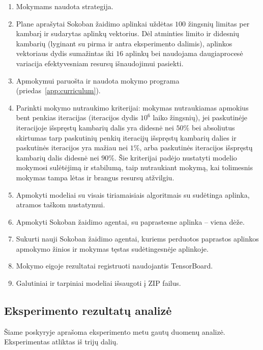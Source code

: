 \documentclass{VUMIFPSbakalaurinis}
\begin{document}
{\begin{enumerate}
\begin{enumerate}
			\item Mokymams naudota  strategija.
			\item Plane aprašytai Sokoban žaidimo aplinkai uždėtas \(100\) žingsnių limitas per kambarį ir sudarytas aplinkų vektorius. Dėl atminties limito ir didesnių kambarių (lyginant su pirma ir antra eksperimento dalimis), aplinkos vektoriaus dydis sumažintas iki \(16\) aplinkų bei naudojama daugiaprocesė variacija efektyvesniam resursų išnaudojimui pasiekti. 
			\item Apmokymui paruošta ir naudota mokymo programa (priedas~\ref{app:curriculum}).
			\item Parinkti mokymo nutraukimo kriterijai: mokymas nutraukiamas apmokius bent penkias iteracijas (iteracijos dydis \(10^6\) laiko žingsnių), jei paskutinėje iteracijoje išspręstų kambarių dalis yra didesnė nei \(50\%\) bei absoliutus skirtumas tarp paskutinių penkių iteracijų išspręstų kambarių dalies ir paskutinės iteracijos yra mažiau nei \(1\%\), arba paskutinės iteracijos išspręstų kambarių dalis didesnė nei \(90\%\). Šie kriterijai padėjo nustatyti modelio mokymosi sulėtėjimą ir stabilumą, taip nutraukiant mokymą, kai tolimesnis mokymas tampa lėtas ir brangus resursų atžvilgiu.
			\item Apmokyti modeliai su visais tiriamaisiais algoritmais su sudėtinga aplinka, atramos taškom nustatymui.
			\item Apmokyti Sokoban žaidimo agentai, su paprastesne aplinka -- viena dėže.
			\item Sukurti nauji Sokoban žaidimo agentai, kuriems perduotos paprastos aplinkos apmokymo žinios ir mokymas tęstas sudėtingesnėje aplinkoje.
			\item Mokymo eigoje rezultatai registruoti naudojantis TensorBoard.
			\item Galutiniai ir tarpiniai modeliai išsaugoti į ZIP failus.
		\end{enumerate}
	\end{enumerate}
}
\subsection{Eksperimento rezultatų analizė}\label{subsubsec:rezults}
{
	Šiame poskyryje aprašoma eksperimento metu gautų duomenų analizė. Eksperimentas atliktas iš trijų dalių.
}
\end{document}
